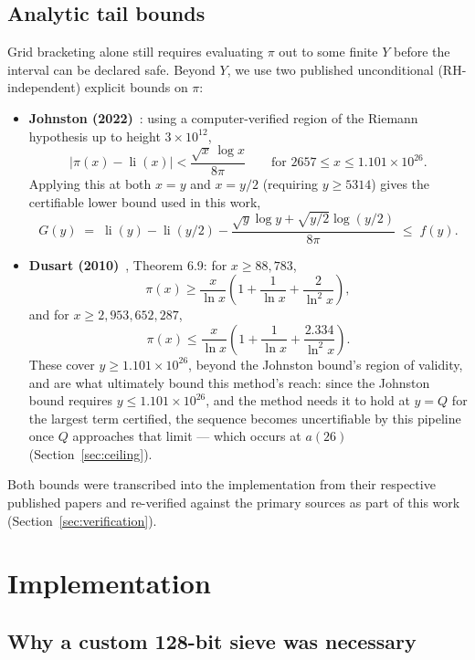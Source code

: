 \documentclass[11pt]{amsart}
\newcommand{\pcount}{\pi}
\newcommand{\li}{\operatorname{li}}
\begin{document}
\subsection{Analytic tail bounds}

Grid bracketing alone still requires evaluating $\pcount$ out to some
finite $Y$ before the interval can be declared safe. Beyond $Y$, we use
two published unconditional (RH-independent) explicit bounds on
$\pcount$:

\begin{itemize}
  \item \textbf{Johnston (2022)}~\cite{johnston2022}: using a
  computer-verified region of the Riemann hypothesis up to height
  $3\times10^{12}$,
  \[
    |\pcount(x) - \li(x)| < \frac{\sqrt{x}\,\log x}{8\pi}
    \qquad \text{for } 2657 \leq x \leq 1.101\times10^{26}.
  \]
  Applying this at both $x=y$ and $x=y/2$ (requiring $y \geq 5314$) gives
  the certifiable lower bound used in this work,
  \[
    G(y) \;=\; \li(y) - \li(y/2) -
    \frac{\sqrt{y}\log y + \sqrt{y/2}\log(y/2)}{8\pi} \;\leq\; f(y).
  \]
  \item \textbf{Dusart (2010)}~\cite{dusart2010}, Theorem 6.9: for
  $x \geq 88{,}783$,
  \[
    \pcount(x) \geq \frac{x}{\ln x}\left(1+\frac1{\ln x}+\frac2{\ln^2 x}\right),
  \]
  and for $x \geq 2{,}953{,}652{,}287$,
  \[
    \pcount(x) \leq \frac{x}{\ln x}\left(1+\frac1{\ln x}+\frac{2.334}{\ln^2 x}\right).
  \]
  These cover $y \geq 1.101\times10^{26}$, beyond the Johnston bound's
  region of validity, and are what ultimately bound this method's reach:
  since the Johnston bound requires $y \leq 1.101\times10^{26}$, and the
  method needs it to hold at $y=Q$ for the largest term certified, the
  sequence becomes uncertifiable by this pipeline once $Q$ approaches
  that limit --- which occurs at $a(26)$ (Section~\ref{sec:ceiling}).
\end{itemize}

Both bounds were transcribed into the implementation from their
respective published papers and re-verified against the primary sources
as part of this work (Section~\ref{sec:verification}).

\section{Implementation}
\label{sec:implementation}

\subsection{Why a custom 128-bit sieve was necessary}
\end{document}
